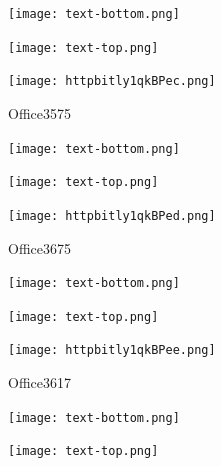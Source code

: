 \documentclass[letterpaper]{article}
\begin{document}
 \centerline{\texttt{[image: text-bottom.png]}} 
 
 \pagebreak 
{} 
 \vspace*{\fill} 
 
  \centerline{\texttt{[image: text-top.png]}} 
 
 \vspace{0.5in} 
 
 \begingroup 
 \centerline{\texttt{[image: httpbitly1qkBPec.png]}} 
 \endgroup 
 \vspace*{\fill} 

 \hfill{\small Office3575} 

  \vspace{0.7in} 
 
 \centerline{\texttt{[image: text-bottom.png]}} 
 
 \pagebreak 
{} 
 \vspace*{\fill} 
 
  \centerline{\texttt{[image: text-top.png]}} 
 
 \vspace{0.5in} 
 
 \begingroup 
 \centerline{\texttt{[image: httpbitly1qkBPed.png]}} 
 \endgroup 
 \vspace*{\fill} 

 \hfill{\small Office3675} 

  \vspace{0.7in} 
 
 \centerline{\texttt{[image: text-bottom.png]}} 
 
 \pagebreak 
{} 
 \vspace*{\fill} 
 
  \centerline{\texttt{[image: text-top.png]}} 
 
 \vspace{0.5in} 
 
 \begingroup 
 \centerline{\texttt{[image: httpbitly1qkBPee.png]}} 
 \endgroup 
 \vspace*{\fill} 

 \hfill{\small Office3617} 

  \vspace{0.7in} 
 
 \centerline{\texttt{[image: text-bottom.png]}} 
 
 \pagebreak 
{} 
 \vspace*{\fill} 
 
  \centerline{\texttt{[image: text-top.png]}} 
 
 \vspace{0.5in} 
 
\end{document}
